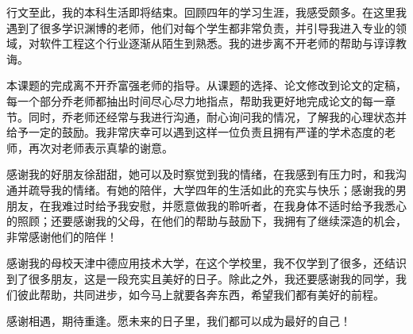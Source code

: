 \documentclass{izdthesis}
\begin{document}
\nocite{ref14}

\begin{acknowledgements}
行文至此，我的本科生活即将结束。回顾四年的学习生涯，我感受颇多。在这里我遇到了很多学识渊博的老师，他们对每个学生都非常负责，并引导我进入专业的领域，对软件工程这个行业逐渐从陌生到熟悉。我的进步离不开老师的帮助与谆谆教诲。

本课题的完成离不开乔富强老师的指导。从课题的选择、论文修改到论文的定稿，每一个部分乔老师都抽出时间尽心尽力地指点，帮助我更好地完成论文的每一章节。同时，乔老师还经常与我进行沟通，耐心询问我的情况，了解我的心理状态并给予一定的鼓励。我非常庆幸可以遇到这样一位负责且拥有严谨的学术态度的老师，再次对老师表示真挚的谢意。

感谢我的好朋友徐甜甜，她可以及时察觉到我的情绪，在我感到有压力时，和我沟通并疏导我的情绪。有她的陪伴，大学四年的生活如此的充实与快乐；感谢我的男朋友，在我难过时给予我安慰，并愿意做我的聆听者，在我身体不适时给予我悉心的照顾；还要感谢我的父母，在他们的帮助与鼓励下，我拥有了继续深造的机会，非常感谢他们的陪伴！

感谢我的母校天津中德应用技术大学，在这个学校里，我不仅学到了很多，还结识到了很多朋友，这是一段充实且美好的日子。除此之外，我还要感谢我的同学，我们彼此帮助，共同进步，如今马上就要各奔东西，希望我们都有美好的前程。

感谢相遇，期待重逢。愿未来的日子里，我们都可以成为最好的自己！
\end{acknowledgements}
\end{document}
